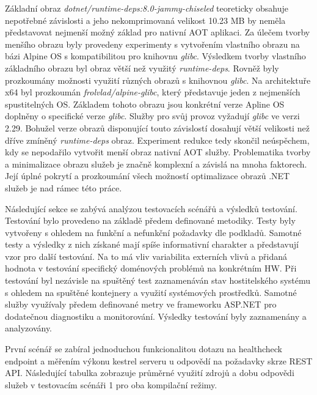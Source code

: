 Základní obraz \emph{dotnet/runtime-deps:8.0-jammy-chiseled} teoreticky obsahuje nepotřebné závislosti a jeho nekomprimovaná velikost 10.23 MB by neměla představovat nejmenší možný základ pro nativní AOT aplikaci. Za úlečem tvorby menšího obrazu byly provedeny experimenty s vytvořením vlastního obrazu na bázi Alpine OS s kompatibilitou pro knihovnu \emph{glibc}. Výsledkem tvorby vlastního základního obrazu byl obraz větší než využitý \emph{runtime-deps}. Rovněž byly prozkoumány možnosti využití různých obrazů s knihovnou \emph{glibc}. Na architektuře x64 byl prozkoumán \emph{frolvlad/alpine-glibc}, který představuje jeden z nejmenších spustitelných OS. Základem tohoto obrazu jsou konkrétní verze Apline OS doplněny o specifické verze \emph{glibc}. Služby pro svůj provoz vyžadují \emph{glibc} ve verzi 2.29. Bohužel verze obrazů disponující touto závislostí dosahují větší velikosti než dříve zmíněný \emph{runtime-deps} obraz. Experiment redukce tedy skončil neúspěchem, kdy se nepodařilo vytvořit menší obraz nativní AOT služby. Problematika tvorby a minimalizace obrazu služeb je značně komplexní a závislá na mnoha faktorech. Její úplné pokrytí a prozkoumání všech možností optimalizace obrazů .NET služeb je nad rámec této práce.


Následující sekce se zabývá analýzou testovacích scénářů a výsledků testování. Testování bylo provedeno na základě předem definované metodiky. Testy byly vytvořeny s ohledem na funkční a nefunkční požadavky dle podkladů. Samotné testy a výsledky z nich získané mají spíše informativní charakter a představují vzor pro další testování. Na to má vliv variabilita externích vlivů a přidaná hodnota v testování specifický doménových problémů na konkrétním HW. Při testování byl nezávisle na spuštěný test zaznamenáván stav hostitelského systému s ohledem na spuštěné kontejnery a využití systémových prostředků. Samotné služby využívaly předem definované metry ve frameworku ASP.NET pro dodatečnou diagnostiku a monitorování. Výsledky testování byly zaznamenány a analyzovány.


První scénář se zabíral jednoduchou funkcionalitou dotazu na healthcheck endpoint a měřením výkonu kestrel serveru u odpovědí na požadavky skrze REST API. Následující tabulka zobrazuje průměrné využití zdrojů a dobu odpovědi služeb v testovacím scénáři 1 pro oba kompilační režimy.

